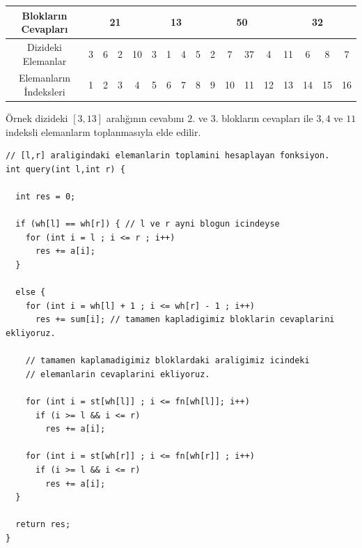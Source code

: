 \documentclass[12pt]{article}
\begin{document}
    \begin{table}[h]
    \begin{tabular}{|c|c|c|c|c|c|c|c|c|c|c|c|c|c|c|c|c|}
    \hline
    Bloklar{\i}n Cevaplar{\i}    & \multicolumn{4}{c|}{21}                                        & \multicolumn{4}{c|}{\cellcolor[HTML]{FFFE65}13} & \multicolumn{4}{c|}{\cellcolor[HTML]{FFFE65}50} & \multicolumn{4}{c|}{32}                   \\ \hline
    Dizideki Elemanlar     & 3 & 6 & \cellcolor[HTML]{FFFE65}2 & \cellcolor[HTML]{FFFE65}10 & 3          & 1          & 4         & 5         & 2         & 7          & 37         & 4         & \cellcolor[HTML]{FFFE65}11 & 6  & 8  & 7  \\ \hline
    Elemanlar{\i}n \.{I}ndeksleri & 1 & 2 & 3                         & 4                          & 5          & 6          & 7         & 8         & 9         & 10         & 11         & 12        & 13                         & 14 & 15 & 16 \\ \hline
    \end{tabular}
    \end{table}
    
    \"{O}rnek dizideki $[3,13]$ aral{\i}\u{g}{\i}n{\i}n cevab{\i}n{\i} $2.$ ve $3.$ bloklar{\i}n cevaplar{\i} ile $3,4$ ve $11$ indeksli elemanlar{\i}n toplanmas{\i}yla elde edilir.
    
    \begin{verbatim}
// [l,r] araligindaki elemanlarin toplamini hesaplayan fonksiyon.
int query(int l,int r) {

  int res = 0;

  if (wh[l] == wh[r]) { // l ve r ayni blogun icindeyse
    for (int i = l ; i <= r ; i++)
      res += a[i];
  }

  else {
    for (int i = wh[l] + 1 ; i <= wh[r] - 1 ; i++)
      res += sum[i]; // tamamen kapladigimiz bloklarin cevaplarini ekliyoruz.

    // tamamen kaplamadigimiz bloklardaki araligimiz icindeki
    // elemanlarin cevaplarini ekliyoruz.

    for (int i = st[wh[l]] ; i <= fn[wh[l]]; i++)
      if (i >= l && i <= r)
        res += a[i];

    for (int i = st[wh[r]] ; i <= fn[wh[r]] ; i++)
      if (i >= l && i <= r)
        res += a[i];
  }

  return res;
}
    \end{verbatim}    
\end{document}
